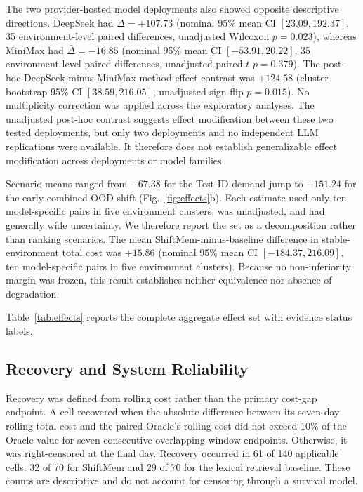 The two provider-hosted model deployments also showed opposite descriptive
directions. DeepSeek had $\bar\Delta=+107.73$ (nominal 95\% mean CI
$[23.09,192.37]$, 35 environment-level paired differences, unadjusted Wilcoxon
$p=0.023$), whereas MiniMax had $\bar\Delta=-16.85$ (nominal 95\% mean CI
$[-53.91,20.22]$, 35 environment-level paired differences, unadjusted paired-$t$
$p=0.379$).
The post-hoc DeepSeek-minus-MiniMax method-effect contrast was $+124.58$
(cluster-bootstrap 95\% CI $[38.59,216.05]$, unadjusted sign-flip $p=0.015$).
No multiplicity correction was applied across the exploratory analyses. The
unadjusted post-hoc contrast suggests effect modification between these two
tested deployments, but only two deployments and no independent LLM replications
were available. It therefore does not establish generalizable effect
modification across deployments or model families.

Scenario means ranged from $-67.38$ for the Test-ID demand jump to $+151.24$
for the early combined OOD shift (Fig.~\ref{fig:effects}b). Each estimate used
only ten model-specific pairs in five environment clusters, was unadjusted, and
had generally wide uncertainty. We therefore report the set as a decomposition
rather than ranking scenarios. The mean ShiftMem-minus-baseline difference in
stable-environment total cost was $+15.86$ (nominal 95\% mean CI
$[-184.37,216.09]$, ten model-specific pairs in five environment clusters).
Because no non-inferiority margin was frozen, this result establishes neither
equivalence nor absence of degradation.

Table~\ref{tab:effects} reports the complete aggregate effect set with evidence
status labels.


\subsection{Recovery and System Reliability}
\label{sec:reliability-results}

Recovery was defined from rolling cost rather than the primary cost-gap
endpoint. A cell recovered when the absolute difference between its seven-day
rolling total cost and the paired Oracle's rolling cost did not exceed 10\% of
the Oracle value for seven consecutive overlapping window endpoints.
Otherwise, it was right-censored at the final day. Recovery occurred in 61 of
140 applicable cells: 32 of 70 for ShiftMem and 29 of 70 for the lexical
retrieval baseline. These counts are descriptive and do not account for censoring through
a survival model.

